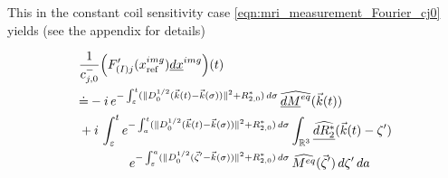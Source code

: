 \documentclass{ws-m3as}
\newcommand{\uld}[1]{\underline{d#1}}
\def\Mpp{M_{\perp\!\!\!\!\!\bigcirc}}
\def\Mphp{\widehat{\Mpp}}
\def\pp{p_{\perp\!\!\!\!\!\bigcirc}}
\newcommand\taup{\varepsilon}
\newcommand{\Dterm}[1]{\|D_0^{1/2}{#1}\|^2}
\newcommand{\Margin}[1]{}
\begin{document}
This in the constant coil sensitivity case \eqref{eqn:mri_measurement_Fourier_cj0} yields (see the appendix 
for details)
\Margin{R1 C.}
\Margin{R2 (3)}
\begin{equation}\label{FIprimeD0}
\begin{aligned}
&\frac{1}{c_{j,0}^-}\Bigl(F_{(I)j}'(x^{img}_{\text{ref}})\uld{x}^{img}\Bigr)(t)
\\
&\dot{=}
-i\,e^{-\int_{\taup}^t(\Dterm{({\vec k}(t)-\vec k(\sigma))}+R_{2,0}^*)\, d\sigma}\,
\widehat{\uld{M}^{eq}}({\vec k}(t))
\\&+i\,\int_{\taup}^t e^{-\int_a^t(\Dterm{({\vec k}(t)-\vec k(\sigma))}+R_{2,0}^*)\, d\sigma}
\int_{\mathbb{R}^3}\widehat{\uld{R_2^*}}({\vec k}(t)-\zeta')\\
&\qquad\qquad e^{-\int_{\taup}^a(\Dterm{(\vec\zeta'-\vec k(\sigma))} +R_{2,0}^*)\, d\sigma}\,\widehat{M^{eq}}(\vec\zeta')
\,d\zeta'\, da
\end{aligned}
\end{equation}
\end{document}
